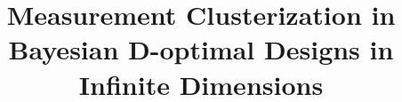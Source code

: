 \documentclass[ba]{imsart}
\begin{document}

\begin{frontmatter}
\title{Measurement Clusterization in Bayesian D-optimal Designs in Infinite Dimensions}


\begin{aug}
\author{ }

\address[addr1]{Azrieli Faculty of Medicine, Bar-Ilan University, Safed, Israel
}

\end{aug}

\begin{abstract}
  
\end{abstract}

\begin{keyword}[class=MSC]
\end{keyword}

\end{frontmatter}







%


\begin{acks}[Acknowledgments]
  
  
  
\end{acks}



\end{document}
